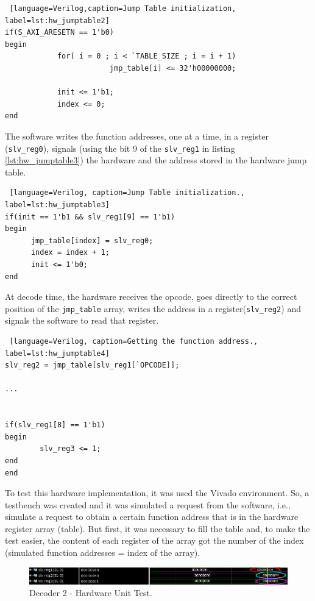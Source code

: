 \begin{lstlisting} [language=Verilog,caption=Jump Table initialization, label=lst:hw_jumptable2]
if(S_AXI_ARESETN == 1'b0)
begin
			for( i = 0 ; i < `TABLE_SIZE ; i = i + 1)
						jmp_table[i] <= 32'h00000000;

			init <= 1'b1;
			index <= 0;         
end
\end{lstlisting}

The software writes the function addresses, one at a time, in a register (\texttt{slv\_reg0}), signals (using the bit 9 of the \texttt{slv\_reg1} in listing \ref{lst:hw_jumptable3}) the hardware and the address stored in the hardware jump table.

\begin{lstlisting} [language=Verilog, caption=Jump Table initialization., label=lst:hw_jumptable3]
if(init == 1'b1 && slv_reg1[9] == 1'b1)
begin
      jmp_table[index] = slv_reg0;
      index = index + 1;
      init <= 1'b0; 
end
\end{lstlisting}

At decode time, the hardware receives the opcode, goes directly to the correct position of the \texttt{jmp\_table} array, writes the address in a register(\texttt{slv\_reg2}) and signals the software to read that register.

\begin{lstlisting} [language=Verilog, caption=Getting the function address., label=lst:hw_jumptable4]
slv_reg2 = jmp_table[slv_reg1[`OPCODE]];

...


if(slv_reg1[8] == 1'b1)
begin           
		slv_reg3 <= 1; 
end
end
\end{lstlisting}


To test this hardware implementation, it was used the Vivado environment. So, a testbench was created and it was simulated a request from the software, i.e., simulate a request to obtain a certain function address that is in the hardware register array (table). But first, it was necessary to fill the table and, to make the test easier, the content of each register of the array got the number of the index (simulated function addresses = index of the array).

\begin{figure}[H]
\centerline{
\includegraphics[scale=0.5]{images/test_bench}
}
\caption{Decoder 2 - Hardware Unit Test.}
\label{fig:test_bench} 
\end{figure}

